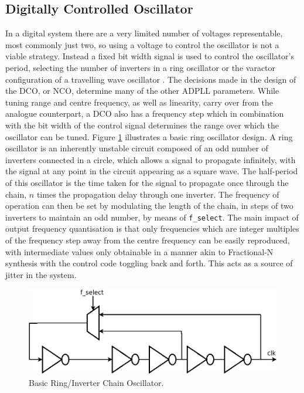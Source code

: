 \subsection{Digitally Controlled Oscillator}
In a digital system there are a very limited number of voltages representable, most commonly just two, so using a voltage to control the oscillator is not a viable strategy. Instead a fixed bit width signal is used to control the oscillator's period, selecting the number of inverters in a ring oscillator or the varactor configuration of a travelling wave oscillator \cite{chen2011rotary}. The decisions made in the design of the \ac{DCO}, or \ac{NCO}, determine many of the other \ac{ADPLL} parameters. While tuning range and centre frequency, as well as linearity, carry over from the analogue counterpart, a \ac{DCO} also has a frequency step which in combination with the bit width of the control signal determines the range over which the oscillator can be tuned. Figure \ref{fig:my_ring} illustrates a basic ring oscillator design. A ring oscillator is an inherently unstable circuit composed of an odd number of inverters connected in a circle, which allows a signal to propagate infinitely, with the signal at any point in the circuit appearing as a square wave. The half-period of this oscillator is the time taken for the signal to propagate once through the chain, $n$ times the propagation delay through one inverter. The frequency of operation can then be set by modulating the length of the chain, in steps of two inverters to maintain an odd number, by means of \texttt{f\_select}. The main impact of output frequency quantisation is that only frequencies which are integer multiples of the frequency step away from the centre frequency can be easily reproduced, with intermediate values only obtainable in a manner akin to Fractional-N synthesis with the control code toggling back and forth. This acts as a source of jitter in the system.
\begin{figure}[h]
	\centering
	\includegraphics[scale=0.275]{../inverter_chain}
	\caption{Basic Ring/Inverter Chain Oscillator.}
	\label{fig:my_ring}
\end{figure}

